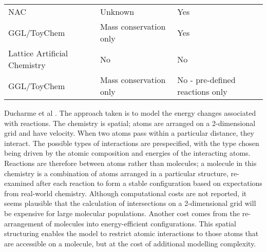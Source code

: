 \begin{table}
\begin{tabular}{@{}p{4cm}p{4.5cm}p{4.5cm}@{}}
		NAC \parencite{Suzuki2006}                                         & Unknown                                                            & Yes                                      \\						
		GGL/ToyChem \parencite{Benko2005}                                  & Mass conservation only                                             & Yes                                      \\
		Lattice Artificial Chemistry \parencite{Ono2000,Madina2003}        & No                                                                 & No                                       \\
		GGL/ToyChem \parencite{Benko2003}                                  & Mass conservation only                                             & No - pre-defined reactions only          \\
		\hline
	\end{tabular}
\end{table}





Ducharme et al \parencite{Ducharme2012}. The approach taken is to model the energy changes associated with reactions. The chemistry is spatial; atoms are arranged on a 2-dimensional grid and have velocity. When two atoms pass within a particular distance, they interact. The possible types of interactions are prespecified, with the type chosen being driven by the atomic composition and energies of the interacting atoms. Reactions are therefore between atoms rather than molecules; a molecule in this chemistry is a combination of atoms arranged in a particular structure, re-examined after each reaction to form a stable configuration based on expectations from real-world chemistry. Although computational costs are not reported, it seems plausible that the calculation of intersections on a 2-dimensional grid will be expensive for large molecular populations. Another cost comes from the re-arrangement of molecules into energy-efficient configurations. This spatial structuring enables the model to restrict atomic interactions to those atoms that are accessible on a molecule, but at the cost of additional modelling complexity. 

